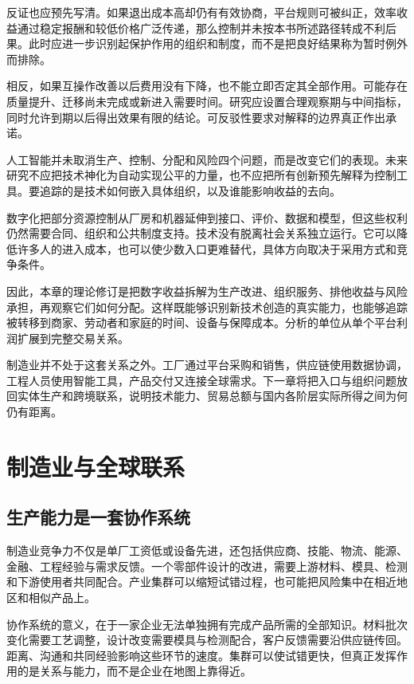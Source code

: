\documentclass[UTF8,fontset=fandol,zihao=-4,oneside,openany]{ctexbook}
\begin{document}
反证也应预先写清。如果退出成本高却仍有有效协商，平台规则可被纠正，效率收益通过稳定报酬和较低价格广泛传递，那么控制并未按本书所述路径转成不利后果。此时应进一步识别起保护作用的组织和制度，而不是把良好结果称为暂时例外而排除。

相反，如果互操作改善以后费用没有下降，也不能立即否定其全部作用。可能存在质量提升、迁移尚未完成或新进入需要时间。研究应设置合理观察期与中间指标，同时允许到期以后得出效果有限的结论。可反驳性要求对解释的边界真正作出承诺。

人工智能并未取消生产、控制、分配和风险四个问题，而是改变它们的表现。未来研究不应把技术神化为自动实现公平的力量，也不应把所有创新预先解释为控制工具。要追踪的是技术如何嵌入具体组织，以及谁能影响收益的去向。

\label{arg:P201}
数字化把部分资源控制从厂房和机器延伸到接口、评价、数据和模型，但这些权利仍然需要合同、组织和公共制度支持。技术没有脱离社会关系独立运行。它可以降低许多人的进入成本，也可以使少数入口更难替代，具体方向取决于采用方式和竞争条件。

因此，本章的理论修订是把数字收益拆解为生产改进、组织服务、排他收益与风险承担，再观察它们如何分配。这样既能够识别新技术创造的真实能力，也能够追踪被转移到商家、劳动者和家庭的时间、设备与保障成本。分析的单位从单个平台利润扩展到完整交易关系。

制造业并不处于这套关系之外。工厂通过平台采购和销售，供应链使用数据协调，工程人员使用智能工具，产品交付又连接全球需求。下一章将把入口与组织问题放回实体生产和跨境联系，说明技术能力、贸易总额与国内各阶层实际所得之间为何仍有距离。


\chapter{制造业与全球联系}
\section{生产能力是一套协作系统}
制造业竞争力不仅是单厂工资低或设备先进，还包括供应商、技能、物流、能源、金融、工程经验与需求反馈。一个零部件设计的改进，需要上游材料、模具、检测和下游使用者共同配合。产业集群可以缩短试错过程，也可能把风险集中在相近地区和相似产品上。

\label{arg:P202}
协作系统的意义，在于一家企业无法单独拥有完成产品所需的全部知识。材料批次变化需要工艺调整，设计改变需要模具与检测配合，客户反馈需要沿供应链传回。距离、沟通和共同经验影响这些环节的速度。集群可以使试错更快，但真正发挥作用的是关系与能力，而不是企业在地图上靠得近。
\end{document}
